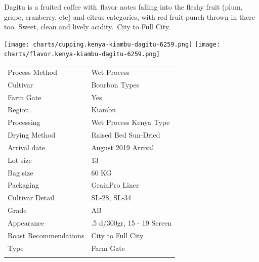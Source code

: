 \documentclass[10pt,twoside,footinclude=true,headinclude=true]{scrbook} %
\newlength{\mysize}
\newcommand{\myfontsize}[1]{
  \setlength{\mysize}{#1pt}
  \fontsize{\mysize}{1.2\mysize}
  \selectfont
}
\begin{document}
\begin{addmargin}[2.2em]{2.2em}
\small
\justify
Dagitu is a fruited coffee with flavor notes falling into the fleshy fruit (plum, grape, cranberry, etc) and citrus categories, with red fruit punch thrown in there too. Sweet, clean and lively acidity. City to Full City.
\end{addmargin}

\centering
\vspace{2em}
\texttt{[image: charts/cupping.kenya-kiambu-dagitu-6259.png]}
\texttt{[image: charts/flavor.kenya-kiambu-dagitu-6259.png]}

\vspace{1em}
\begin{table}[htbp]
\myfontsize{7}
\hspace*{2.2em}
\begin{tabular}{ >{\raggedleft\arraybackslash}p{3.6cm}!{\color{lightgray}\vrule}p{7cm} }
\hline
  Process Method & Wet Process \\
  \hline
  Cultivar & Bourbon Types \\
  \hline
  Farm Gate & Yes \\
  \hline
  Region & Kiambu \\
  \hline
  Processing & Wet Process Kenya Type \\
  \hline
  Drying Method & Raised Bed Sun-Dried \\
  \hline
  Arrival date & August 2019 Arrival \\
  \hline
  Lot size & 13 \\
  \hline
  Bag size & 60 KG \\
  \hline
  Packaging & GrainPro Liner \\
  \hline
  Cultivar Detail & SL-28, SL-34 \\
  \hline
  Grade & AB \\
  \hline
  Appearance & .5 d/300gr, 15 - 19 Screen \\
  \hline
  Roast Recommendations & City to Full City \\
  \hline
  Type & Farm Gate \\
  \hline

\end{tabular}
\end{table}
\end{document}
